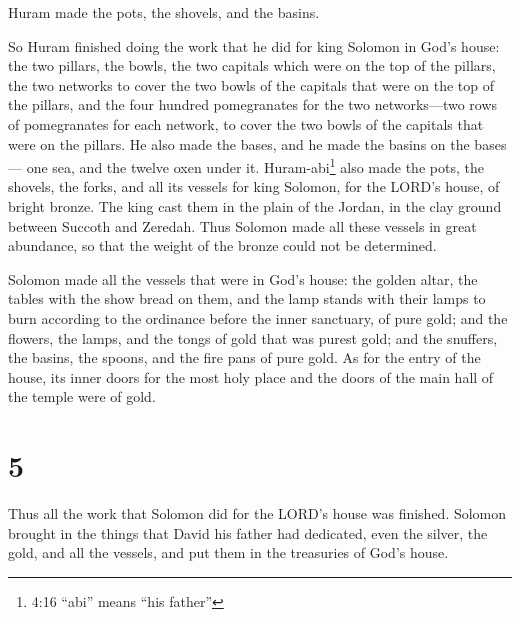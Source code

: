  Huram made the pots, the shovels, and the basins.

So Huram finished doing the work that he did for king Solomon in God's
house:  the two pillars, the bowls, the two capitals which
were on the top of the pillars, the two networks to cover the two bowls
of the capitals that were on the top of the pillars,  and
the four hundred pomegranates for the two networks---two rows of
pomegranates for each network, to cover the two bowls of the capitals
that were on the pillars.  He also made the bases, and he
made the basins on the bases---  one sea, and the twelve
oxen under it.  Huram-abi\footnote{4:16 ``abi'' means ``his
  father''} also made the pots, the shovels, the forks, and all its
vessels for king Solomon, for the LORD's house, of bright bronze.
 The king cast them in the plain of the Jordan, in the clay
ground between Succoth and Zeredah.  Thus Solomon made all
these vessels in great abundance, so that the weight of the bronze could
not be determined.

 Solomon made all the vessels that were in God's house: the
golden altar, the tables with the show bread on them,  and
the lamp stands with their lamps to burn according to the ordinance
before the inner sanctuary, of pure gold;  and the flowers,
the lamps, and the tongs of gold that was purest gold;  and
the snuffers, the basins, the spoons, and the fire pans of pure gold. As
for the entry of the house, its inner doors for the most holy place and
the doors of the main hall of the temple were of gold.

\hypertarget{section-4}{%
\section{5}\label{section-4}}

 Thus all the work that Solomon did for the LORD's house was
finished. Solomon brought in the things that David his father had
dedicated, even the silver, the gold, and all the vessels, and put them
in the treasuries of God's house.

